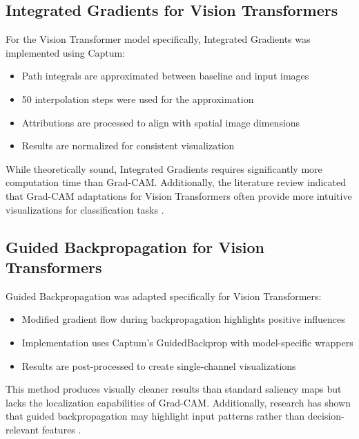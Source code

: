 \documentclass[a4paper,12pt]{report}
\begin{document}
\subsection{Integrated Gradients for Vision Transformers}

For the Vision Transformer model specifically, Integrated Gradients was implemented using Captum:

\begin{itemize}
    \item Path integrals are approximated between baseline and input images
    \item 50 interpolation steps were used for the approximation
    \item Attributions are processed to align with spatial image dimensions
    \item Results are normalized for consistent visualization
\end{itemize}

While theoretically sound, Integrated Gradients requires significantly more computation time than Grad-CAM. Additionally, the literature review indicated that Grad-CAM adaptations for Vision Transformers often provide more intuitive visualizations for classification tasks \cite{chefer2021transformer}.

\subsection{Guided Backpropagation for Vision Transformers}

Guided Backpropagation was adapted specifically for Vision Transformers:

\begin{itemize}
    \item Modified gradient flow during backpropagation highlights positive influences
    \item Implementation uses Captum's GuidedBackprop with model-specific wrappers
    \item Results are post-processed to create single-channel visualizations
\end{itemize}

This method produces visually cleaner results than standard saliency maps but lacks the localization capabilities of Grad-CAM. Additionally, research has shown that guided backpropagation may highlight input patterns rather than decision-relevant features \cite{nie2018theoretical}.
\end{document}
